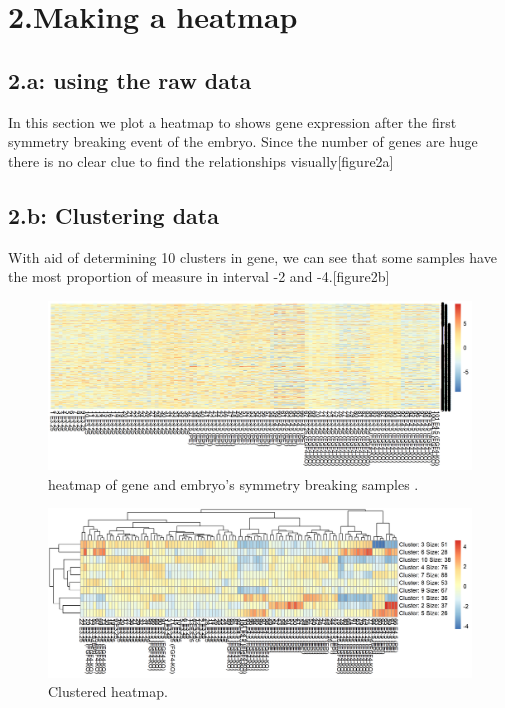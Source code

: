 \documentclass[a4paper, 11pt]{article}
\begin{document}
\newpage
\section*{2.Making a heatmap}
\subsection*{2.a: using the raw data}
In this section we plot a heatmap to shows gene expression after the ﬁrst symmetry breaking event of the embryo. Since the number of genes are huge there is no clear clue to find the relationships visually[figure2a]

\subsection*{2.b: Clustering data}
With aid of determining 10 clusters in gene, \cite{pheatmap} we can see that some samples have the most proportion of measure in interval -2 and -4.[figure2b]

\begin{figure}[H]
\includegraphics[width = \textwidth]{figure2a.png}
\caption{heatmap of gene and embryo's symmetry breaking samples .}
\label{Figure2a}
\end{figure}
\begin{figure}[H]
\includegraphics[width = \textwidth]{figure2b.png}
\caption{Clustered heatmap.}
\label{Figure2b}
\end{figure}
\end{document}
